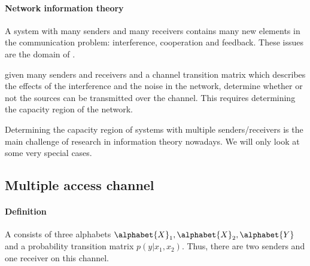 \documentclass[a4paper, 11pt, openany]{book}
\begin{document}
\paragraph{Network information theory}
A system with many senders and many receivers contains many new elements in the communication problem: interference, cooperation and feedback. These issues are the domain of .

 given many senders and receivers and a channel transition matrix which describes the effects of the interference and the noise in the network, determine whether or not the sources can be transmitted over the channel. This requires determining the capacity region of the network.

Determining the capacity region of systems with multiple senders/receivers is the main challenge of research in information theory nowadays. We will only look at some very special cases.




\subsection{Multiple access channel}

\paragraph{Definition}

A  consists of three alphabets $\alphabet{X}_1, \alphabet{X}_2, \alphabet{Y}$ and a probability transition matrix $p(y | x_1, x_2)$. Thus, there are two senders and one receiver on this channel.


\begin{center}
\end{center}
\end{document}
